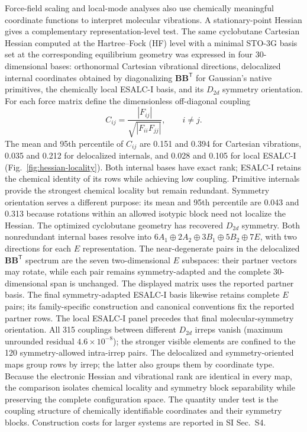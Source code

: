 \documentclass[journal=jctcce,manuscript=article,layout=traditional]{achemso}
\newcommand{\Bmat}{\mathbf{B}}
\theoremstyle{definition}
\begin{document}
Force-field scaling and local-mode analyses also use chemically meaningful
coordinate functions to interpret molecular vibrations.\cite{RauhutPulay1995,BakerJarzeckiPulay1998,Kraka2022LocalModes}
A stationary-point Hessian gives a complementary representation-level test.
The same cyclobutane Cartesian Hessian computed at the Hartree--Fock (HF)
level with a minimal STO-3G basis set at the corresponding equilibrium geometry was expressed in
{four 30-dimensional bases: orthonormal Cartesian vibrational
directions, delocalized internal coordinates obtained by diagonalizing
\(\Bmat\Bmat^{\mathsf T}\) for Gaussian's native primitives, the chemically
local ESALC-I basis, and its \(D_{2d}\) symmetry orientation.}
For each force matrix define the dimensionless
off-diagonal coupling
\begin{equation}
 C_{ij}=\frac{|F_{ij}|}{\sqrt{|F_{ii}F_{jj}|}},\qquad i\ne j.
 \label{eq:hessian-locality-coupling}
\end{equation}
{The mean and 95th percentile of \(C_{ij}\) are 0.151 and
0.394 for Cartesian vibrations, 0.035 and 0.212 for delocalized internals,
and 0.028 and 0.105 for local ESALC-I (Fig.~\ref{fig:hessian-locality}).  Both
internal bases have exact rank; ESALC-I retains the chemical identity of its
rows while achieving low coupling.  Primitive internals provide the strongest
chemical locality but remain redundant.  Symmetry orientation serves a
different purpose: its mean and 95th percentile are 0.043 and 0.313 because
rotations within an allowed isotypic block need not localize the Hessian.}
{The optimized cyclobutane geometry has recovered \(D_{2d}\)
symmetry.  Both nonredundant internal bases resolve into
\(6A_1\oplus2A_2\oplus3B_1\oplus5B_2\oplus7E\), with two directions
for each \(E\) representation.  The near-degenerate pairs in the delocalized
\(\Bmat\Bmat^{\mathsf T}\) spectrum are the seven two-dimensional \(E\)
subspaces: their partner vectors may rotate, while each pair remains
symmetry-adapted and the complete 30-dimensional span is unchanged.  The
displayed matrix uses the reported partner basis.  The final
symmetry-adapted ESALC-I basis likewise retains complete \(E\) pairs; its
family-specific construction and canonical conventions fix the reported
partner rows.  The local ESALC-I panel precedes that final molecular-symmetry
orientation.}
All 315 couplings
between different \(D_{2d}\) irreps vanish (maximum unrounded residual
\(4.6\times10^{-8}\)); the stronger visible elements are confined to the 120
symmetry-allowed intra-irrep pairs.  {The delocalized and
symmetry-oriented maps group rows by irrep; the latter also groups them by
coordinate type.}
Because the electronic Hessian and vibrational rank are identical in every
map, the comparison isolates chemical locality and symmetry block separability
while preserving the complete configuration space.  {The quantity
under test is the coupling structure of chemically identifiable coordinates
and their symmetry blocks.}  Construction costs for larger systems are reported in SI Sec.~S4.
\end{document}
